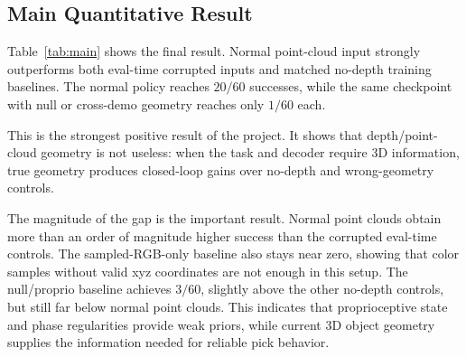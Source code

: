 \documentclass[conference]{IEEEtran}
\begin{document}
\subsection{Main Quantitative Result}

Table~\ref{tab:main} shows the final result. Normal point-cloud input strongly outperforms both eval-time corrupted inputs and matched no-depth training baselines. The normal policy reaches $20/60$ successes, while the same checkpoint with null or cross-demo geometry reaches only $1/60$ each.

\begin{table}[t]
\centering
\caption{Final ManiSkill3 PickCube results. The normal policy uses raw cropped point clouds.}
\label{tab:main}
\end{table}

This is the strongest positive result of the project. It shows that depth/point-cloud geometry is not useless: when the task and decoder require 3D information, true geometry produces closed-loop gains over no-depth and wrong-geometry controls.

The magnitude of the gap is the important result. Normal point clouds obtain more than an order of magnitude higher success than the corrupted eval-time controls. The sampled-RGB-only baseline also stays near zero, showing that color samples without valid xyz coordinates are not enough in this setup. The null/proprio baseline achieves $3/60$, slightly above the other no-depth controls, but still far below normal point clouds. This indicates that proprioceptive state and phase regularities provide weak priors, while current 3D object geometry supplies the information needed for reliable pick behavior.
\end{document}

